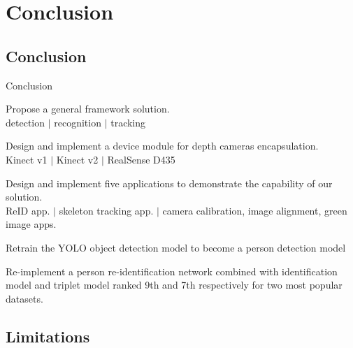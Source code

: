\documentclass{beamer}
\begin{document}
\section{Conclusion}

\subsection{Conclusion}

\begin{frame}{Conclusion}
    \begin{itemize}
        {\normalsize
            \item Propose a general framework solution.\\
            {\tiny detection $|$ recognition $|$ tracking}
            
            \item Design and implement a device module for depth cameras 
            encapsulation.\\
            {\tiny Kinect v1 $|$ Kinect v2 $|$ RealSense D435}

            \item Design and implement five applications to demonstrate 
            the capability of our solution.\\
            {\tiny ReID app. $|$ skeleton tracking app. 
                $|$ camera calibration, image alignment, green image apps.}
            
            \item Retrain the YOLO object detection model to become a 
            person detection model %
            
            \item Re-implement a person re-identification network combined
            with identification model and triplet model ranked 9th and 7th
            respectively for two most popular datasets.
        }
    \end{itemize}
\end{frame}

\subsection{Limitations}
\end{document}
